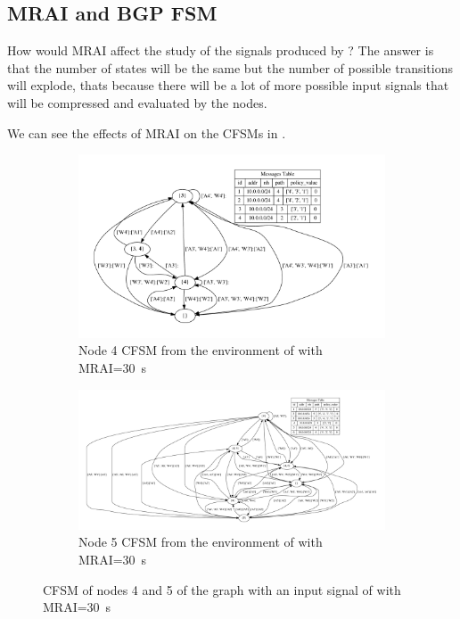 \subsection{MRAI and BGP FSM}
\label{subsec:mrai_vs_bgpfsm}

How would \ac{MRAI} affect the study of the signals produced by ?
The answer is that the number of states will be the same but the number of possible
transitions will explode, thats because there will be a lot of more possible
input signals that will be compressed and evaluated by the nodes.

We can see the effects of \ac{MRAI} on the \ac{CFSM}s in .

\begin{figure}[h]
     \centering
     \begin{subfigure}[b]{0.45\textwidth}
         \centering
         \includegraphics[width=\textwidth]{images/fsm/fig_4_4_MRAI30.pdf}
		 \caption{Node \num{4} \ac{CFSM} from the environment of  with \ac{MRAI}=\SI{30}{\second}}
         \label{fig:fsm_node4_MRAI}
     \end{subfigure}
     \hfill
     \begin{subfigure}[b]{0.45\textwidth}
         \centering
         \includegraphics[width=\textwidth]{images/fsm/fig_4_5_MRAI30.pdf}
		 \caption{Node \num{5} \ac{CFSM} from the environment of  with \ac{MRAI}=\SI{30}{\second}}
         \label{fig:fsm_node5_MRAI}
     \end{subfigure}
		\caption{\ac{CFSM} of nodes \num{4} and \num{5} of the graph 
			 with an input signal of  with
			\ac{MRAI}=\SI{30}{\second}}
        \label{fig:fsm_griffin_fig4_MRAI}
\end{figure}

